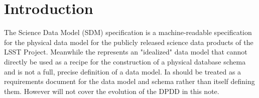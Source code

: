 
\section{Introduction}

The Science Data Model (SDM) specification is a machine-readable specification for the physical data model for the publicly released science data products of the LSST Project.
Meanwhile the \DPDD  represents an "idealized" data model that cannot directly be used as a recipe for the construction of a physical database schema and is not a full, precise definition of a data model.
Ia should be treated as a requirements document for the data model and schema rather than itself defining them. However will not cover the evolution of the DPDD in this note.


